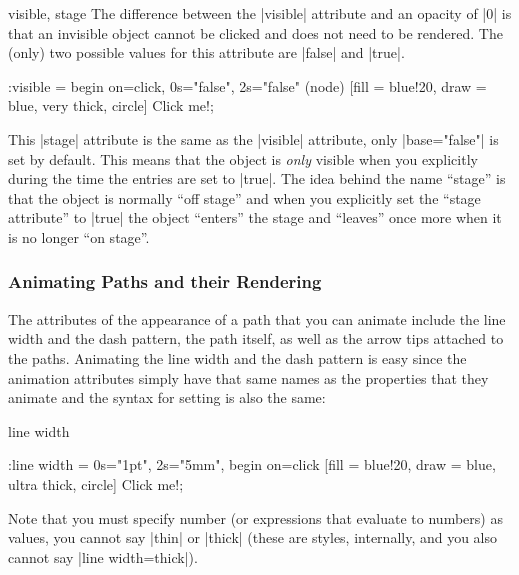 \begin{tikzanimateattribute}{visible, stage}
    The difference between the |visible| attribute and an opacity of |0| is
    that an invisible object cannot be clicked and does not need to be
    rendered. The (only) two possible values for this attribute are |false| and
    |true|.
\begin{codeexample}[
    preamble={\usetikzlibrary{animations}},
    animation list={1,2,3,4},
]
\tikz :visible = {begin on=click, 0s="false", 2s="false"}
  \node (node) [fill = blue!20, draw = blue, very thick, circle] {Click me!};
\end{codeexample}

    This |stage| attribute is the same as the |visible| attribute, only
    |base="false"| is set by default. This means that the object is \emph{only}
    visible when you explicitly during the time the entries are set to |true|.
    The idea behind the name ``stage'' is that the object is normally ``off
    stage'' and when you explicitly set the ``stage attribute'' to |true| the
    object ``enters'' the stage and ``leaves'' once more when it is no longer
    ``on stage''.
\begin{codeexample}[
    preamble={\usetikzlibrary{animations}},
    animation list={-1,0,1,2,3},
    animation bb={(1.3,-0.7) rectangle (2.7,0.7)},
]
\end{codeexample}
\end{tikzanimateattribute}


\subsubsection{Animating Paths and their Rendering}
\label{section-animation-paths}

The attributes of the appearance of a path that you can animate include the
line width and the dash pattern, the path itself, as well as the arrow tips
attached to the paths. Animating the line width and the dash pattern is easy
since the animation attributes simply have that same names as the properties
that they animate and the syntax for setting is also the same:

\begin{tikzanimateattribute}{line width}
\begin{codeexample}[
    preamble={\usetikzlibrary{animations}},
    animation list={0.5,1,1.5,2},
]
\tikz \node :line width = { 0s="1pt", 2s="5mm", begin on=click}
  [fill = blue!20, draw = blue, ultra thick, circle] {Click me!};
\end{codeexample}
    Note that you must specify number (or expressions that evaluate to numbers)
    as values, you cannot say |thin| or |thick| (these are styles, internally,
    and you also cannot say |line width=thick|).
\end{tikzanimateattribute}

